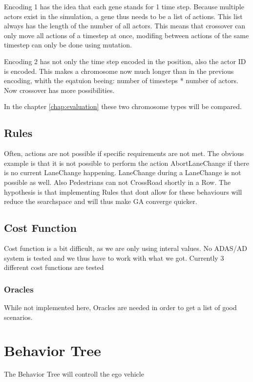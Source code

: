 Encoding 1 has the idea that each gene stands for 1 time step. Because multiple actors exist in the simulation, a gene thus needs to be a list of actions. This list always has the length of the number of all actors. This means that crossover can only move all actions of a timestep at once, modifing between actions of the same timestep can only be done using mutation.

Encoding 2 has not only the time step encoded in the position, also the actor ID is encoded. This makes a chromosome now much longer than in the previous encoding, whith the eqatuion beeing: number of timesteps * number of actors. Now crossover has more possibilities.

In the chapter \ref{chap:evaluation} these two chromosome types will be compared.

\subsection{Rules}
Often, actions are not possible if specific requirements are not met. The obvious example is that it is not possible to perform the action AbortLaneChange if there is no current LaneChange happening. LaneChange during a LaneChange is not possible as well. Also Pedestrians can not CrossRoad shortly in a Row.
The hypothesis is that implementing Rules that dont allow for these behaviours will reduce the searchspace and will thus make GA converge quicker.

\subsection{Cost Function}
Cost function is a bit difficult, as we are only using interal values. No ADAS/AD system is tested and we thus have to work with what we got.
Currently 3 different cost functions are tested

\subsubsection{Oracles}
While not implemented here, Oracles are needed in order to get a list of good scenarios.


\section{Behavior Tree}
The Behavior Tree will controll the ego vehicle 

